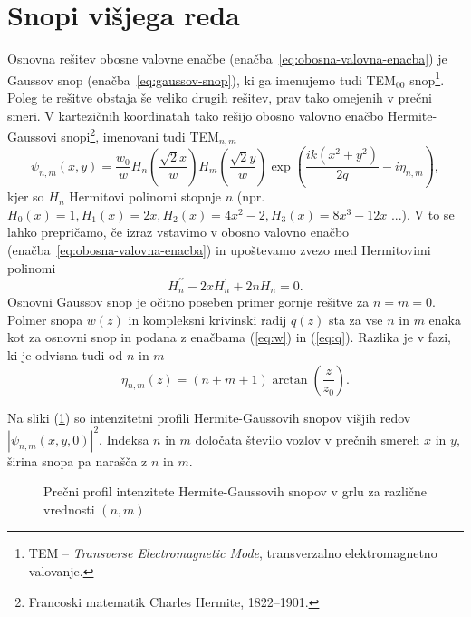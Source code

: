 \section{Snopi višjega reda}
Osnovna rešitev obosne valovne enačbe (enačba~\ref{eq:obosna-valovna-enacba}) 
je Gaussov snop (enačba~\ref{eq:gaussov-snop}), ki ga imenujemo tudi TEM$_{00}$ 
snop\footnote{TEM -- {\it Transverse Electromagnetic Mode}, 
transverzalno elektromagnetno valovanje.}. 
Poleg te rešitve obstaja še veliko drugih rešitev, prav tako omejenih v prečni smeri. 
V kartezičnih koordinatah tako rešijo obosno valovno enačbo
Hermite-Gaussovi snopi\footnote{Francoski matematik Charles Hermite, 1822--1901.}, imenovani tudi TEM$_{n,m}$
\begin{equation}
\psi_{n,m}(x,y)=\frac{w_{0}}{w}H_{n}\left(\frac{\sqrt{2}x}{w}\right)H_{m}\left(\frac{\sqrt{2}y}{w}\right)
\exp\left(\frac{ik(x^{2}+y^{2})}{2q}-i\eta_{n,m}\right),
\label{eq:Gauss-Hermitevi}
\end{equation}
kjer so $H_{n}$ Hermitovi polinomi stopnje $n$ (npr. $H_0(x)=1, H_1(x)=2x, H_2(x)=4x^2-2, H_3(x)=8x^3-12x$ ...). 
V to se lahko
prepričamo, če izraz vstavimo v obosno valovno enačbo
(enačba~\ref{eq:obosna-valovna-enacba}) in upoštevamo zvezo med Hermitovimi polinomi 
\begin{equation}
H_{n}^{\prime\prime}-2xH_{n}^{\prime}+2nH_{n}=0.
\end{equation}
Osnovni Gaussov snop je očitno poseben primer gornje rešitve za $n=m=0$.
Polmer snopa $w(z)$ in kompleksni krivinski radij $q(z)$ sta za
vse $n$ in $m$ enaka kot za osnovni snop in podana z enačbama (\ref{eq:w})
in (\ref{eq:q}). Razlika je v fazi, ki je odvisna tudi od $n$ in $m$
\begin{equation}
\eta_{n,m}\left(z\right)=(n+m+1)\arctan\left(\frac{z}{z_{0}}\right).
\end{equation}

Na sliki (\ref{fig:Gauss-Hermitevi-snopi}) so intenzitetni profili 
Hermite-Gaussovih snopov višjih redov $|\psi_{n,m}(x, y, 0)|^2$.
Indeksa $n$ in $m$ določata število vozlov v prečnih smereh $x$ in $y$,
širina snopa pa narašča z $n$ in $m$. 

\begin{figure}[h]
\centering
\def\svgwidth{90truemm} 

\caption{Prečni profil intenzitete Hermite-Gaussovih snopov v grlu 
za različne vrednosti $(n,m)$}
\label{fig:Gauss-Hermitevi-snopi}
\end{figure}

